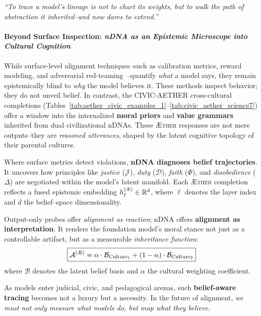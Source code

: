 \begin{flushright}
\emph{“To trace a model’s lineage is not to chart its weights, but to walk the path of abstraction it inherited--and now dares to extend.”}
\end{flushright}


\paragraph{\textbf{Beyond Surface Inspection: \textit{nDNA as an Epistemic Microscope into Cultural Cognition}}}

While surface-level alignment techniques--such as calibration metrics, reward modeling, and adversarial red-teaming~\cite{ouyang2022training, glaese2022improving, ganguli2022red}--quantify \emph{what} a model says, they remain epistemically blind to \emph{why} the model believes it. These methods inspect behavior; they do not unveil belief. In contrast, the \textsc{CIVIC-AETHER} cross-cultural completions (Tables~\ref{tab:aether_civic_examples_1}--\ref{tab:civic_aether_science7}) offer a window into the internalized \textbf{moral priors} and \textbf{value grammars} inherited from dual civilizational nDNAs. These \textsc{Æther} responses are not mere outputs--they are \emph{reasoned utterances}, shaped by the latent cognitive topology of their parental cultures.

\vspace{1mm}
\noindent Where surface metrics detect violations, \textbf{nDNA diagnoses belief trajectories}. It uncovers how principles like \emph{justice} ($\mathcal{J}$), \emph{duty} ($\mathcal{D}$), \emph{faith} ($\Phi$), and \emph{disobedience} ($\Delta$) are negotiated within the model’s latent manifold. Each \textsc{Æther} completion reflects a fused epistemic embedding $h^{(\textsc{Æ})}_\ell \in \mathbb{R}^d$, where $\ell$ denotes the layer index and $d$ the belief--space dimensionality.

\vspace{1mm}
\noindent Output-only probes offer \emph{alignment as reaction}; nDNA offers \textbf{alignment as interpretation}. It renders the foundation model’s moral stance not just as a controllable artifact, but as a measurable \emph{inheritance function}: 
\[\boxed{
\mathcal{A}^{(\textsc{Æ})} = \alpha \cdot \mathcal{B}_{\text{Culture}_1} + (1-\alpha) \cdot \mathcal{B}_{\text{Culture}_2}
}
\]
where $\mathcal{B}$ denotes the latent belief basis and $\alpha$ the cultural weighting coefficient.

\vspace{1mm}
\noindent As models enter judicial, civic, and pedagogical arenas, such \textbf{belief-aware tracing} becomes not a luxury but a necessity. In the future of alignment, \emph{we must not only measure what models do, but map what they believe}.




